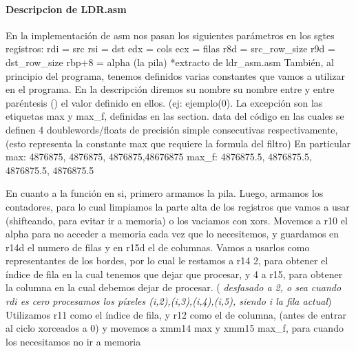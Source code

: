 \documentclass[a4paper]{article}
\begin{document}
        
\paragraph{\textbf{Descripcion de LDR.asm}}
\hfill \break           
        En la implementación de asm nos pasan los siguientes parámetros en los sgtes registros:
        \hfill \break
   rdi = src
   \hfill \break
   rsi = dst
   \hfill \break
   edx = cols
   \hfill \break
   ecx = filas
   \hfill \break
   r8d = src_row_size
   \hfill \break
   r9d = dst_row_size
   \hfill \break
   rbp+8 = alpha (la pila)
   \hfill \break
*extracto de ldr_asm.asm
\hfill \break
        También, al principio del programa, tenemos definidos varias constantes que vamos a utilizar en el programa. En la descripción diremos su nombre su nombre entre {} y entre paréntesis () el valor definido en ellos. (ej: {ejemplo(0)}.
        \hfill \break
         La excepción son las etiquetas max y max_f, definidas en las section. data del código en las cuales se definen 4 doublewords/floats de precisión simple consecutivas respectivamente, (esto representa la constante max que requiere la formula del filtro)
        En particular 
        \hfill \break
        max: 4876875, 4876875, 4876875,48676875
        \hfill \break
        max_f: 4876875.5, 4876875.5, 4876875.5, 4876875.5
        \hfill \break
        
        En cuanto a la función en si, primero armamos la pila. Luego, armamos los contadores, para lo cual  limpiamos la parte alta de los registros que vamos a usar (shifteando, para evitar ir a memoria) o los vaciamos con xors. Movemos a r10 el alpha para no acceder a memoria cada vez que lo necesitemos, y guardamos en r14d el numero de filas y en r15d el de columnas. Vamos a usarlos como representantes de los bordes, por lo cual le restamos a r14 2, para obtener el índice de fila en la cual tenemos que dejar que procesar, y 4 a r15, para obtener la columna en la cual debemos dejar de procesar.      
        (\textit{ desfasado a 2, o sea cuando rdi es cero procesamos los píxeles {(i,2),(i,3),(i,4),(i,5)}, siendo i la fila actual})
        \hfill \break 
        Utilizamos r11 como el índice de fila, y r12 como el de columna, (antes de entrar al ciclo xorceados a 0)  y movemos a xmm14 max y xmm15 max_f, para cuando los necesitamos no ir  a memoria
        \hfill \break
        \\
        
\end{document}
